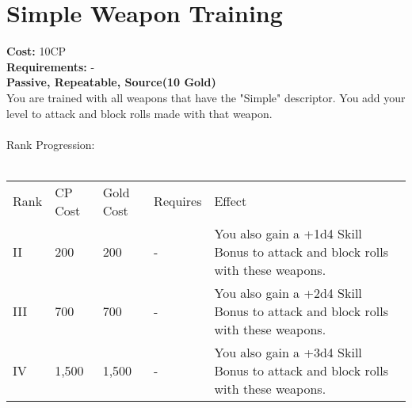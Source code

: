 \section{Simple Weapon Training}\label{perk:simpleWeaponTraining}
\textbf{Cost:} 10CP\\
\textbf{Requirements:} -\\
\textbf{Passive, Repeatable, Source(10 Gold)}\\
You are trained with all weapons that have the "Simple" descriptor.
You add your level to attack and block rolls made with that weapon.\\
\\
Rank Progression:\\
\\
\begin{tabular}{l | l | l | l | l}
	Rank & CP Cost & Gold Cost & Requires & Effect\\
	II & 200 & 200 & - & You also gain a +1d4 Skill Bonus to attack and block rolls with these weapons.\\
	III & 700 & 700 & - & You also gain a +2d4 Skill Bonus to attack and block rolls with these weapons.\\
	IV & 1,500 & 1,500 & - & You also gain a +3d4 Skill Bonus to attack and block rolls with these weapons.\\
\end{tabular}